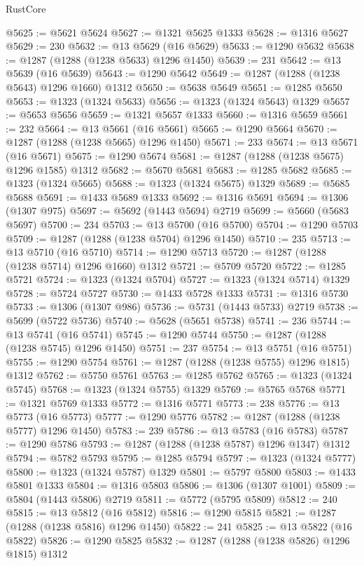 \begin{lexlean}{RustCore}
\begin{coremodule}
@5625 := @5621 @5624
@5627 := @1321 @5625 @1333
@5628 := @1316 @5627
@5629 := 230
@5632 := @13 @5629 (@16 @5629)
@5633 := @1290 @5632
@5638 := @1287 (@1288 (@1238 @5633) @1296 @1450)
@5639 := 231
@5642 := @13 @5639 (@16 @5639)
@5643 := @1290 @5642
@5649 := @1287 (@1288 (@1238 @5643) @1296 @1660) @1312
@5650 := @5638 @5649
@5651 := @1285 @5650
@5653 := @1323 (@1324 @5633)
@5656 := @1323 (@1324 @5643) @1329
@5657 := @5653 @5656
@5659 := @1321 @5657 @1333
@5660 := @1316 @5659
@5661 := 232
@5664 := @13 @5661 (@16 @5661)
@5665 := @1290 @5664
@5670 := @1287 (@1288 (@1238 @5665) @1296 @1450)
@5671 := 233
@5674 := @13 @5671 (@16 @5671)
@5675 := @1290 @5674
@5681 := @1287 (@1288 (@1238 @5675) @1296 @1585) @1312
@5682 := @5670 @5681
@5683 := @1285 @5682
@5685 := @1323 (@1324 @5665)
@5688 := @1323 (@1324 @5675) @1329
@5689 := @5685 @5688
@5691 := @1433 @5689 @1333
@5692 := @1316 @5691
@5694 := @1306 (@1307 @975)
@5697 := @5692 (@1443 @5694) @2719
@5699 := @5660 (@5683 @5697)
@5700 := 234
@5703 := @13 @5700 (@16 @5700)
@5704 := @1290 @5703
@5709 := @1287 (@1288 (@1238 @5704) @1296 @1450)
@5710 := 235
@5713 := @13 @5710 (@16 @5710)
@5714 := @1290 @5713
@5720 := @1287 (@1288 (@1238 @5714) @1296 @1660) @1312
@5721 := @5709 @5720
@5722 := @1285 @5721
@5724 := @1323 (@1324 @5704)
@5727 := @1323 (@1324 @5714) @1329
@5728 := @5724 @5727
@5730 := @1433 @5728 @1333
@5731 := @1316 @5730
@5733 := @1306 (@1307 @986)
@5736 := @5731 (@1443 @5733) @2719
@5738 := @5699 (@5722 @5736)
@5740 := @5628 (@5651 @5738)
@5741 := 236
@5744 := @13 @5741 (@16 @5741)
@5745 := @1290 @5744
@5750 := @1287 (@1288 (@1238 @5745) @1296 @1450)
@5751 := 237
@5754 := @13 @5751 (@16 @5751)
@5755 := @1290 @5754
@5761 := @1287 (@1288 (@1238 @5755) @1296 @1815) @1312
@5762 := @5750 @5761
@5763 := @1285 @5762
@5765 := @1323 (@1324 @5745)
@5768 := @1323 (@1324 @5755) @1329
@5769 := @5765 @5768
@5771 := @1321 @5769 @1333
@5772 := @1316 @5771
@5773 := 238
@5776 := @13 @5773 (@16 @5773)
@5777 := @1290 @5776
@5782 := @1287 (@1288 (@1238 @5777) @1296 @1450)
@5783 := 239
@5786 := @13 @5783 (@16 @5783)
@5787 := @1290 @5786
@5793 := @1287 (@1288 (@1238 @5787) @1296 @1347) @1312
@5794 := @5782 @5793
@5795 := @1285 @5794
@5797 := @1323 (@1324 @5777)
@5800 := @1323 (@1324 @5787) @1329
@5801 := @5797 @5800
@5803 := @1433 @5801 @1333
@5804 := @1316 @5803
@5806 := @1306 (@1307 @1001)
@5809 := @5804 (@1443 @5806) @2719
@5811 := @5772 (@5795 @5809)
@5812 := 240
@5815 := @13 @5812 (@16 @5812)
@5816 := @1290 @5815
@5821 := @1287 (@1288 (@1238 @5816) @1296 @1450)
@5822 := 241
@5825 := @13 @5822 (@16 @5822)
@5826 := @1290 @5825
@5832 := @1287 (@1288 (@1238 @5826) @1296 @1815) @1312

\end{coremodule}
\end{lexlean}
